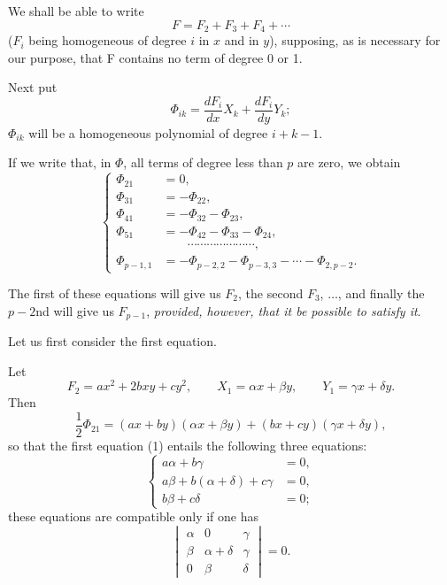 \documentclass[11pt]{article}
\begin{document}
We shall be able to write
\[
F=F_2+F_3+F_4+\cdots
\]
($F_i$ being homogeneous of degree $i$ in $x$ and in $y$), supposing, as is necessary for our purpose, that F contains no term of degree 0 or 1.

Next put
\[
\Phi_{ik}=\frac{dF_i}{dx}X_k+\frac{dF_i}{dy}Y_k;
\]
$\Phi_{ik}$ will be a homogeneous polynomial of degree $i+k-1$.

If we write that, in $\Phi$, all terms of degree less than $p$ are zero, we obtain
\begin{equation}\tag{1}
\left\{
\begin{aligned}
\Phi_{21}&=0,\\
\Phi_{31}&=-\Phi_{22},\\
\Phi_{41}&=-\Phi_{32}-\Phi_{23},\\
\Phi_{51}&=-\Phi_{42}-\Phi_{33}-\Phi_{24},\\
&\hspace{2em}\cdots\cdots\cdots\cdots\cdots\cdots\cdots,\\
\Phi_{p-1,1}&=-\Phi_{p-2,2}-\Phi_{p-3,3}-\cdots-\Phi_{2,p-2}.
\end{aligned}
\right.
\end{equation}

The first of these equations will give us $F_2$, the second $F_3$, $\ldots$, and finally the $p-2$nd will give us $F_{p-1}$, \emph{provided, however, that it be possible to satisfy it}.

Let us first consider the first equation.

Let
\[
F_2=ax^2+2bxy+cy^2,
\qquad
X_1=\alpha x+\beta y,
\qquad
Y_1=\gamma x+\delta y.
\]
Then
\[
\frac{1}{2}\Phi_{21}=(ax+by)(\alpha x+\beta y)+(bx+cy)(\gamma x+\delta y),
\]
so that the first equation (1) entails the following three equations:
\begin{equation}\tag{2}
\left\{
\begin{aligned}
a\alpha+b\gamma&=0,\\
a\beta+b(\alpha+\delta)+c\gamma&=0,\\
b\beta+c\delta&=0;
\end{aligned}
\right.
\end{equation}
these equations are compatible only if one has
\begin{equation}\tag{3}
\begin{vmatrix}
\alpha&0&\gamma\\
\beta&\alpha+\delta&\gamma\\
0&\beta&\delta
\end{vmatrix}=0.
\end{equation}
\end{document}
